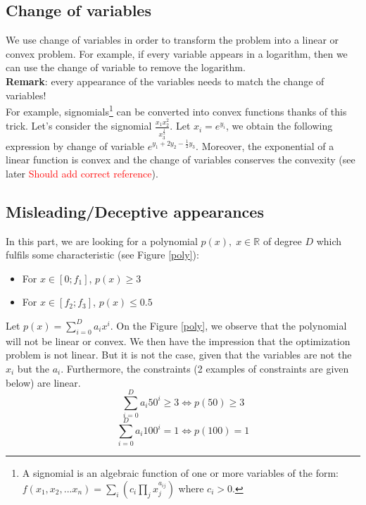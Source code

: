 \subsection{Change of variables}

We use change of variables in order to transform the problem into a linear or convex problem. For example, if every variable appears in a logarithm, then we can use the change of variable to remove the logarithm.\\ 
\textbf{Remark}: every appearance of the variables needs to match the change of variables! \\

For example, signomials\footnote{A signomial is an algebraic function of one or more variables of the form:\\ $f(x_1,x_2,...x_n) = \sum_i{(c_i\prod_j{x_j^{a_{ij}}})}$ where $c_i >0$.} can be converted into convex functions thanks of this trick. Let's consider the signomial $\frac{x_1x_2^2}{x_3^{\frac{1}{2}}}$. Let $x_i = e^{y_i}$, we obtain the following expression by change of variable $e^{y_1+2y_2-\frac{1}{2}y_3}$. Moreover, the exponential of a linear function is convex and the change of variables conserves the convexity (see later \textcolor{red}{Should add correct reference}).

\subsection{Misleading/Deceptive appearances}

In this part, we are looking for a polynomial $p(x), \; x \in \mathbb{R}$ of degree $D$ which fulfils some characteristic (see Figure \ref{poly}): 
\begin{itemize}
\item{For $x \in \left[0;f_1\right]$, $p(x) \geq 3$}
\item{For $x \in \left[f_2;f_3\right]$, $p(x) \leq 0.5$} \\
\end{itemize}

Let $p(x) = \sum_{i=0}^{D} a_i x^{i}$.
On the Figure \ref{poly}, we observe that the polynomial will not be linear or convex. We then have the impression that the optimization problem is not linear. But it is not the case, given that the variables are not the $x_i$ but the $a_i$.
Furthermore, the constraints (2 examples of constraints are given below) are linear. 
$$ \sum_{i=0}^{D} a_i 50^{i} \geq 3 \Leftrightarrow p(50) \geq 3$$
$$ \sum_{i=0}^{D} a_i 100^{i} = 1 \Leftrightarrow p(100)=1$$

